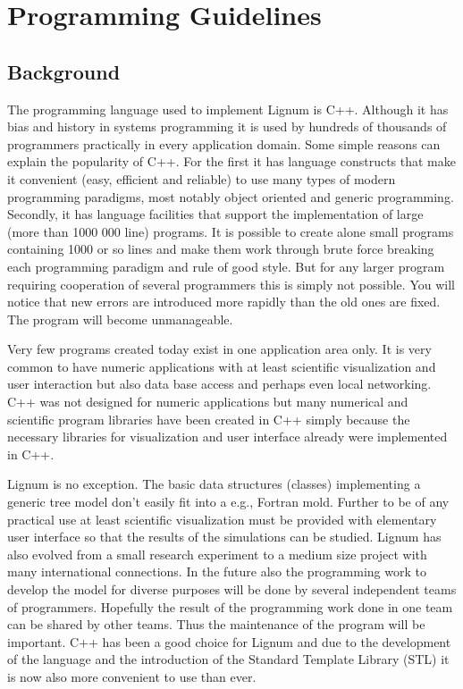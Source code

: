 \chapter{Programming Guidelines}

\section{Background}
The programming language used to  implement Lignum is C++. Although it
has bias and history in systems  programming it is used by hundreds of
thousands of programmers practically in every application domain. Some
simple reasons can explain the popularity of C++. For the first it has
language  constructs  that make  it  convenient  (easy, efficient  and
reliable)  to use  many types  of modern  programming  paradigms, most
notably  object oriented  and generic  programming.  Secondly,  it has
language  facilities that  support the  implementation of  large (more
than 1000  000 line) programs.  It  is possible to  create alone small
programs containing  1000 or so lines  and make them  work through brute
force breaking each  programming paradigm and rule of  good style. But
for any  larger program  requiring cooperation of  several programmers
this  is simply not  possible.  You  will notice  that new  errors are
introduced more rapidly than the old ones are fixed.  The program will
become unmanageable.

Very few programs created today exist in one application area only. It
is very common  to have numeric applications with  at least scientific
visualization  and user  interaction  but also  data  base access  and
perhaps  even local  networking.   C++ was  not  designed for  numeric
applications but many numerical  and scientific program libraries have
been  created  in  C++  simply  because the  necessary  libraries  for
visualization and user interface already were implemented in C++. 

Lignum  is   no  exception.   The  basic   data  structures  (classes)
implementing  a generic  tree  model  don't easily  fit  into a  e.g.,
Fortran mold. Further  to be of any practical  use at least scientific
visualization must be provided with elementary user interface so that
the  results of  the  simulations  can be  studied.   Lignum has  also
evolved from a small research experiment to a medium size project with
many international  connections.  In  the future also  the programming
work to develop the model for diverse purposes will be done by several
independent  teams  of  programmers.   Hopefully  the  result  of  the
programming work done  in one team can be shared  by other teams. Thus
the maintenance of the program will  be important. C++ has been a good
choice for Lignum  and due to the development of  the language and the
introduction of  the Standard  Template Library (STL)  it is  now also
more convenient to use than ever.

